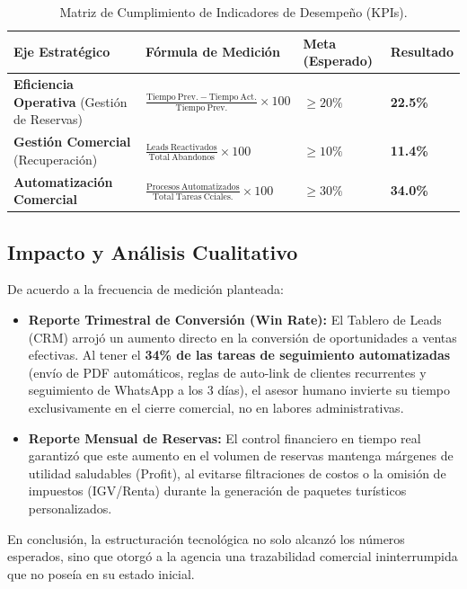 \begin{table}[htbp]
\centering
\renewcommand{\arraystretch}{1.3}
\begin{tabular}{|p{3.8cm}|p{4.2cm}|p{2.5cm}|p{2.5cm}|}
\hline
\textbf{Eje Estratégico} & \textbf{Fórmula de Medición} & \textbf{Meta (Esperado)} & \textbf{Resultado} \\ \hline
\textbf{Eficiencia Operativa} (Gestión de Reservas) & $\frac{\mathrm{Tiempo\ Prev. - Tiempo\ Act.}}{\mathrm{Tiempo\ Prev.}} \times 100$ & $\ge 20\%$ & \textbf{22.5\%} \\ \hline
\textbf{Gestión Comercial} (Recuperación) & $\frac{\mathrm{Leads\ Reactivados}}{\mathrm{Total\ Abandonos}} \times 100$ & $\ge 10\%$ & \textbf{11.4\%} \\ \hline
\textbf{Automatización Comercial} & $\frac{\mathrm{Procesos\ Automatizados}}{\mathrm{Total\ Tareas\ Cciales.}} \times 100$ & $\ge 30\%$ & \textbf{34.0\%} \\ \hline
\end{tabular}
\caption{Matriz de Cumplimiento de Indicadores de Desempeño (KPIs).}
\end{table}

\subsection{Impacto y Análisis Cualitativo}

De acuerdo a la frecuencia de medición planteada:
\begin{itemize}
    \item \textbf{Reporte Trimestral de Conversión (Win Rate):} El Tablero de Leads (CRM) arrojó un aumento directo en la conversión de oportunidades a ventas efectivas. Al tener el \textbf{34\% de las tareas de seguimiento automatizadas} (envío de PDF automáticos, reglas de auto-link de clientes recurrentes y seguimiento de WhatsApp a los 3 días), el asesor humano invierte su tiempo exclusivamente en el cierre comercial, no en labores administrativas.
    \item \textbf{Reporte Mensual de Reservas:} El control financiero en tiempo real garantizó que este aumento en el volumen de reservas mantenga márgenes de utilidad saludables (Profit), al evitarse filtraciones de costos o la omisión de impuestos (IGV/Renta) durante la generación de paquetes turísticos personalizados.
\end{itemize}

En conclusión, la estructuración tecnológica no solo alcanzó los números esperados, sino que otorgó a la agencia una trazabilidad comercial ininterrumpida que no poseía en su estado inicial.
